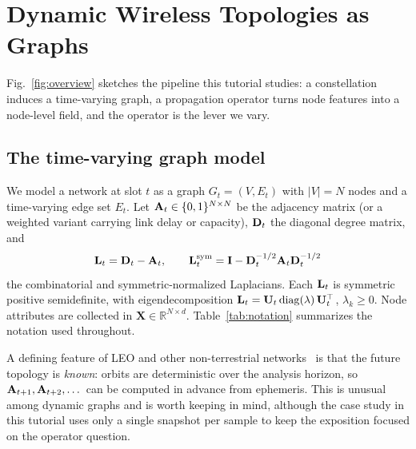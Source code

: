 \section{Dynamic Wireless Topologies as Graphs}
\label{sec:background}

Fig.~\ref{fig:overview} sketches the pipeline this tutorial studies: a constellation
induces a time-varying graph, a propagation operator turns node features into a
node-level field, and the operator is the lever we vary.


\subsection{The time-varying graph model}
We model a network at slot $t$ as a graph $G_t=(V,E_t)$ with $|V|=N$ nodes and a
time-varying edge set $E_t$. Let $\mathbf{A}_t\in\{0,1\}^{N\times N}$ be the adjacency
matrix (or a weighted variant carrying link delay or capacity), $\mathbf{D}_t$ the diagonal
degree matrix, and
\begin{equation}
\mathbf{L}_t=\mathbf{D}_t-\mathbf{A}_t, \qquad
\mathbf{L}_t^{\mathrm{sym}}=\mathbf{I}-\mathbf{D}_t^{-1/2}\mathbf{A}_t\mathbf{D}_t^{-1/2}
\end{equation}
the combinatorial and symmetric-normalized Laplacians. Each $\mathbf{L}_t$ is symmetric
positive semidefinite, with eigendecomposition $\mathbf{L}_t=\mathbf{U}_t\,\mathrm{diag}(\lambda)\,\mathbf{U}_t^{\top}$,
$\lambda_k\ge 0$. Node attributes are collected in $\mathbf{X}\in\mathbb{R}^{N\times d}$.
Table~\ref{tab:notation} summarizes the notation used throughout.

A defining feature of LEO and other non-terrestrial
networks~\cite{kodheli2021ntn,handley2018delay} is that the future
topology is \emph{known}: orbits are deterministic over the analysis horizon, so
$\mathbf{A}_{t+1},\mathbf{A}_{t+2},\dots$ can be computed in advance from ephemeris. This is
unusual among dynamic graphs and is worth keeping in mind, although the case study
in this tutorial uses only a single snapshot per sample to keep the exposition focused
on the operator question.

